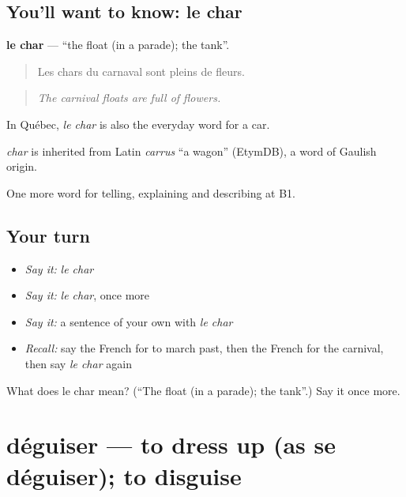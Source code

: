 \subsection*{You'll want to know: le char}
\textbf{le char} — \textquotedblleft{}the float (in a parade); the tank\textquotedblright{}.

\begin{quote}
Les chars du carnaval sont pleins de fleurs.
\end{quote}

\begin{quote}
\emph{The carnival floats are full of flowers.}
\end{quote}

In Québec, \emph{le char} is also the everyday word for a car.

\begin{cousinweb}
\emph{char} is inherited from Latin \emph{carrus} \textquotedblleft{}a wagon\textquotedblright{} (EtymDB), a word of Gaulish origin.
\end{cousinweb}

\begin{grammarlens}[title={What you've built}]
One more word for telling, explaining and describing at B1.
\end{grammarlens}

\subsection*{Your turn}
\begin{itemize}
\raggedright
  \item \emph{Say it:} \emph{le char}
  \item \emph{Say it:} \emph{le char}, once more
  \item \emph{Say it:} a sentence of your own with \emph{le char}
  \item \emph{Recall:} say the French for to march past, then the French for the carnival, then say \emph{le char} again
\end{itemize}

\begin{tcolorbox}[breakable,colback=teal!4,colframe=teal!35!black,title={Before you move on}]
What does le char mean? (\textquotedblleft{}The float (in a parade); the tank\textquotedblright{}.) Say it once more.
\end{tcolorbox}
\section[déguiser]{déguiser — to dress up (as se déguiser); to disguise}

